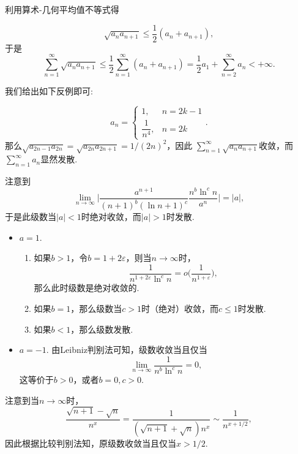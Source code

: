 \begin{ans}
  \begin{enumb}
    \item 利用算术-几何平均值不等式得
  \end{enumb}
  \[
    \sqrt{a_na_{n+1}} \le \frac12(a_n+a_{n+1}),
  \]
  于是
  \[ \sum_{n=1}^\infty\sqrt{a_na_{n+1}}\le\frac12
  \sum_{n=1}^\infty(a_n+a_{n+1})=\frac12a_1+
  \sum_{n=2}^\infty a_n<+\infty. \]
  \begin{enumb}\setcounter{enumi}{1}
    \item 我们给出如下反例即可:
  \end{enumb}
  \[
    a_n = \begin{cases}
      1, & n = 2k-1\\
      \dfrac1{n^4}, & n=2k
    \end{cases}.
  \]
  那么$\sqrt{a_{2n-1}a_{2n}}=\sqrt{a_{2n}a_{2n+1}}=1/(2n)^2$，因此
  $\sum_{n=1}^\infty \sqrt{a_na_{n+1}}$收敛，而$\sum_{n=1}^\infty a_n$显然发散.
\end{ans}

\begin{ans}
  注意到
  \[
    \lim_{n\to\infty}\bigg|
      \frac{a^{n+1}}{(n+1)^b(\ln n+1)^c}
      \frac{n^b\ln^cn}{a^n}
    \bigg|= |a|,
  \]
  于是此级数当$|a|<1$时绝对收敛，而$|a|>1$时发散.
  \begin{itemize}
    \item $a=1$.
      \begin{enumerate}[label=(\arabic*)]
         \item 如果$b>1$，令$b=1+2\varepsilon$，则当$n\to\infty$时，
           \[
              \frac1{n^{1+2\varepsilon}\ln^cn}=
              o\bigg(\frac1{n^{1+\varepsilon}}\bigg),
           \]
           那么此时级数是绝对收敛的.
         \item 如果$b=1$，那么级数当$c>1$时（绝对）收敛，而$c\le1$时发散.
         \item 如果$b<1$，那么级数发散.
      \end{enumerate}
    \item $a=-1$. 由Leibniz判别法可知，级数收敛当且仅当
    \[ \lim_{n\to\infty}\frac1{n^b\ln^c n}=0, \]
    这等价于$b>0$，或者$b=0,c>0$.
  \end{itemize}
\end{ans}

\begin{ans}
  注意到当$n\to\infty$时，
  \[
    \frac{\sqrt{n+1}-\sqrt n}{n^x} =
    \frac1{(\sqrt{n+1}+\sqrt n)n^x}
    \sim \frac1{n^{x+1/2}},
  \]
  因此根据比较判别法知，原级数收敛当且仅当$x>1/2$.
\end{ans}


